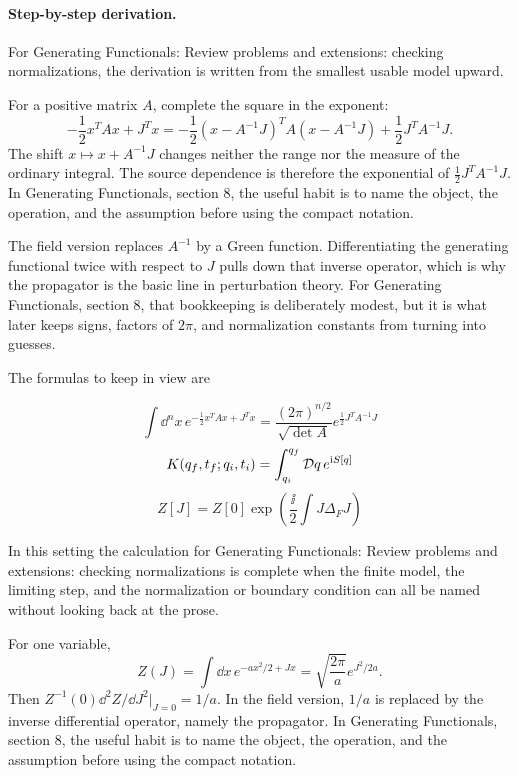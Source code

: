 \paragraph{Step-by-step derivation.}

For Generating Functionals: Review problems and extensions: checking normalizations, the derivation is written from the smallest usable model upward.

For a positive matrix \(A\), complete the square in the exponent:
\[
  -\frac12x^TAx+J^Tx
  =
  -\frac12(x-A^{-1}J)^TA(x-A^{-1}J)
  +\frac12J^TA^{-1}J.
\]
The shift \(x\mapsto x+A^{-1}J\) changes neither the range nor the measure of the ordinary integral.  The source dependence is therefore the exponential of \(\frac12J^TA^{-1}J\).  In Generating Functionals, section 8, the useful habit is to name the object, the operation, and the assumption before using the compact notation.

The field version replaces \(A^{-1}\) by a Green function.  Differentiating the generating functional twice with respect to \(J\) pulls down that inverse operator, which is why the propagator is the basic line in perturbation theory.  For Generating Functionals, section 8, that bookkeeping is deliberately modest, but it is what later keeps signs, factors of \(2\pi\), and normalization constants from turning into guesses.

The formulas to keep in view are

\[
  \int\dd^n x\,e^{-\frac12x^TAx+J^Tx}=\frac{(2\pi)^{n/2}}{\sqrt{\det A}}e^{\frac12J^TA^{-1}J}
\]
\[
  K(q_f,t_f;q_i,t_i)=\int_{q_i}^{q_f}\mathcal D q\,e^{\mathrm i S[q]}
\]
\[
  Z[J]=Z[0]\exp\left(\frac{\ii}{2}\int J\Delta_FJ\right)
\]

In this setting the calculation for Generating Functionals: Review problems and extensions: checking normalizations is complete when the finite model, the limiting step, and the normalization or boundary condition can all be named without looking back at the prose.




\begin{example}
For one variable,
\[
  Z(J)=\int\dd x\,e^{-ax^2/2+Jx}
  =\sqrt{\frac{2\pi}{a}}e^{J^2/2a}.
\]
Then \(Z^{-1}(0)\dd^2Z/\dd J^2|_{J=0}=1/a\).  In the field version, \(1/a\) is replaced by the inverse differential operator, namely the propagator.  In Generating Functionals, section 8, the useful habit is to name the object, the operation, and the assumption before using the compact notation.
\end{example}



